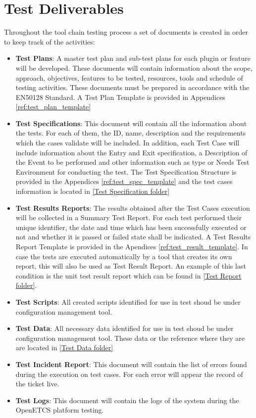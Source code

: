 \section{Test Deliverables}
Throughout the tool chain testing process a set of documents is created in order to keep track of the activities:
\begin{itemize}
\item \textbf{Test Plans}: A master test plan and sub-test plans for each plugin or feature will be developed. These documents will contain information about the scope, approach, objectives, features to be tested, resources, tools and schedule of testing activities.  These documents must be prepared in accordance with the EN50128 Standard. A Test Plan Template is provided in Appendices \ref{ref:test_plan_template}
\item \textbf{Test Specifications}: This document will contain all the information about the tests. For each of them, the ID, name, description and the requirements which the cases validate will be included. In addition, each Test Case will include information about the Entry and Exit specification, a Description of the Event to be performed and other information such as type or Needs Test Environment for conducting the test. The Test Specification Structure is provided in the Appendices \ref{ref:test_spec_template} and the test cases information is located in \href{https://github.com/openETCS/toolchain/tree/master/tool/bundles/Tests/Tests%20Specifications}{[Test Specification folder]}
\item \textbf{Test Results Reports}: The results obtained after the Test Cases execution will be collected in a Summary Test Report. For each test performed their unique identifier, the date and time which has been successfully executed or not and whether it is passed or failed state shall be indicated. A Test Results Report Template is provided in the Apendices \ref{ref:test_result_template}. In case the tests are executed automatically by a tool that creates its own report, this will also be used as Test Result Report. An example of this last condition is the unit test result report which can be found in \href{https://openetcs.ci.cloudbees.com/job/openETCS-tycho/lastBuild/testReport/}{[Test Report folder]}.
\item \textbf{Test Scripts}: All created scripts identified for use in test shoud be under configuration management tool.
\item \textbf{Test Data}: All necessary data identified for use in test shoud be under configuration management tool. These data or the reference where they are are located in \href{https://github.com/openETCS/toolchain/tree/master/tool/bundles/Tests/Tests%20Data/}{[Test Data folder]}
\item \textbf{Test Incident Report}: This document will contain the list of errors found during the execution on test cases. For each error will appear the record of the ticket live.  
\item \textbf{Test Logs}: This document will contain the logs of the system during the OpenETCS platform testing.
\end{itemize}

